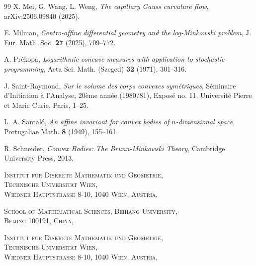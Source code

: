 \documentclass[12pt]{amsart}
\numberwithin{equation}{section}
\newcommand{\8}{\infty}
\renewcommand{\(}{\left(}
\renewcommand{\)}{\right)}
\begin{document}
\begin{thebibliography}{99}
X. Mei, G. Wang, L. Weng, \textit{The capillary Gauss curvature flow}, arXiv:2506.09840 (2025).

E. Milman, \textit{Centro-affine differential geometry and the log-Minkowski problem}, J. Eur. Math. Soc. \textbf{27} (2025), 709--772.

A. Pr\'ekopa, \textit{Logarithmic concave measures with application to stochastic programming}, Acta Sci. Math. (Szeged) \textbf{32} (1971), 301--316.

J. Saint-Raymond, \textit{Sur le volume des corps convexes sym\'etriques}, S\'eminaire d'Initiation \`a l'Analyse, 20\`eme ann\'ee (1980/81), Expos\'e no. 11, Universit\'e Pierre et Marie Curie, Paris, 1--25.

L. A. Santal\'o, \textit{An affine invariant for convex bodies of $n$-dimensional space}, Portugaliae Math. \textbf{8} (1949), 155--161.

R. Schneider, \textit{Convex Bodies: The Brunn-Minkowski Theory}, Cambridge University Press, 2013.

\end{thebibliography}

\vspace{25mm}

	\textsc{Institut f\"{u}r Diskrete Mathematik und Geometrie,\\ Technische Universit\"{a}t Wien,\\ Wiedner Hauptstra{\ss}e 8-10, 1040 Wien, Austria,\\} 

\vspace{5mm}
	
	\textsc{School of Mathematical Sciences, Beihang University,\\ Beijing 100191, China,\\}

	
\vspace{5mm}
        
\textsc{Institut f\"{u}r Diskrete Mathematik und Geometrie,\\ Technische Universit\"{a}t Wien,\\ Wiedner Hauptstra{\ss}e 8-10, 1040 Wien, Austria,\\} 
\end{document}
